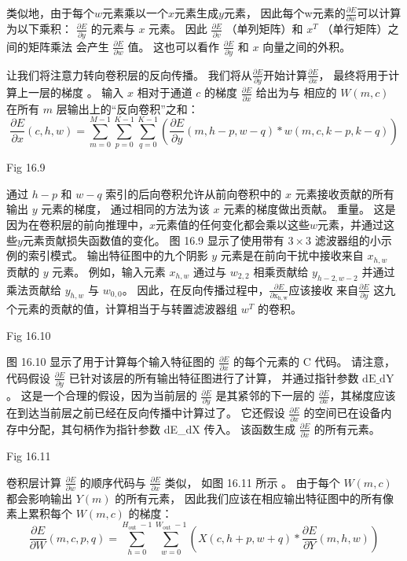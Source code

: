 类似地，由于每个$w$元素乘以一个$x$元素生成$y$元素，
因此每个w元素的$\frac{\partial E}{\partial w}$可以计算为以下乘积： 
$\frac{\partial E}{\partial y}$ 的元素与 $x$ 元素。 
因此 $\frac{\partial E}{\partial v}$ （单列矩阵）和 $x^{T}$ （单行矩阵）之间的矩阵乘法
会产生 $\frac{\partial E}{\partial w}$ 值。 
这也可以看作 $\frac{\partial E}{\partial y}$ 和 $x$ 向量之间的外积。

让我们将注意力转向卷积层的反向传播。 
我们将从$\frac{\partial E}{\partial y}$开始计算$\frac{\partial E}{\partial x}$，
最终将用于计算上一层的梯度 。 
输入 $x$ 相对于通道 $c$ 的梯度 $\frac{\partial E}{\partial x}$ 给出为与
相应的 $W(m, c) $ 在所有 $m$ 层输出上的“反向卷积”之和：
$$
\frac{\partial E}{\partial x}(c, h, w)=\sum_{m=0}^{M-1} \sum_{p=0}^{K-1} \sum_{q =0}^{K-1}\left(\frac{\partial E}{\partial y}(m, h-p, w-q) * w(m, c, k-p, k-q)\right)
$$

{\color{red} Fig 16.9}

通过 $h-p$ 和 $w-q$ 索引的后向卷积允许从前向卷积中的 $x$ 元素接收贡献的所有输出 $y$ 元素的梯度，
通过相同的方法为该 $x$ 元素的梯度做出贡献。 重量。 
这是因为在卷积层的前向推理中，$x$元素值的任何变化都会乘以这些$w$元素，并通过这些$y$元素贡献损失函数值的变化。 
图 16.9 显示了使用带有 $3 \times 3$ 滤波器组的小示例的索引模式。 
输出特征图中的九个阴影 $y$ 元素是在前向干扰中接收来自 $x_{h, w}$ 贡献的 $y$ 元素。 
例如，输入元素 $x_{h, w}$ 通过与 $w_{2,2}$ 相乘贡献给 $y_{h-2, w-2}$ 并通过乘法贡献给 $y_{h, w}$ 与 $w_{0,0}$。 
因此，在反向传播过程中，$\frac{\partial E}{\partial \mathrm{x}_{\mathrm{h}, \mathrm{w}}}$应该接收
来自$\frac{\partial E}{\partial y}$ 这九个元素的贡献的值，计算相当于与转置滤波器组 $w^{T}$ 的卷积。

{\color{red} Fig 16.10}

图 16.10 显示了用于计算每个输入特征图的 $\frac{\partial E}{\partial x}$ 的每个元素的 $\mathrm{C}$ 代码。 
请注意，代码假设 $\frac{\partial E}{\partial y}$ 已针对该层的所有输出特征图进行了计算，
并通过指针参数 $\mathrm{dE} \_\mathrm{ dY}$。 
这是一个合理的假设，因为当前层的 $\frac{\partial E}{\partial y}$ 
是其紧邻的下一层的 $\frac{\partial E}{\partial x}$，其梯度应该 在到达当前层之前已经在反向传播中计算过了。 
它还假设 $\frac{\partial E}{\partial x}$ 的空间已在设备内存中分配，其句柄作为指针参数 dE\_dX 传入。 
该函数生成 $\frac{\partial E}{\partial x}$ 的所有元素。

{\color{red} Fig 16.11}

卷积层计算 $\frac{\partial E}{\partial w}$ 的顺序代码与 $\frac{\partial E}{\partial x}$ 类似，
如图 16.11 所示 。 由于每个 $W(m, c)$ 都会影响输出 $Y(m)$ 的所有元素，
因此我们应该在相应输出特征图中的所有像素上累积每个 $W(m, c)$ 的梯度：
$$
\frac{\partial E}{\partial W}(m, c, p, q)=\sum_{h=0}^{H_{\text {out }}-1} \sum_{w=0}^ {W_{\text {out }}-1}\left(X(c, h+p, w+q) * \frac{\partial E}{\partial Y}(m, h, w)\right)
$$

